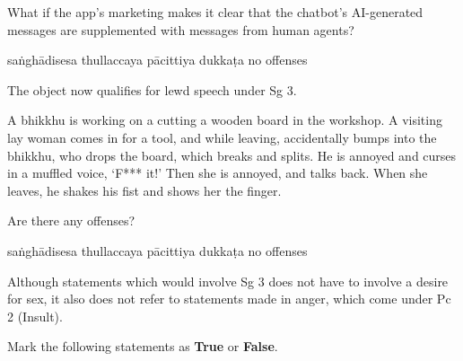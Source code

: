 \begin{exam}{\autoExamName}
\begin{problem*}
\begin{parts}
    \item What if the app's marketing makes it clear that the chatbot's AI-generated messages are supplemented with messages from human agents?

    \begin{answers}{5}
        \bChoices
         saṅghādisesa\eAns
         thullaccaya\eAns
         pācittiya\eAns
         dukkaṭa\eAns
         no offenses\eAns
        \eChoices
    \end{answers}

    \begin{solution}
      The object now qualifies for lewd speech under Sg 3.
    \end{solution}

  \end{parts}

\end{problem*}

\problemDivide

\begin{problem}
  A bhikkhu is working on a cutting a wooden board in the workshop.
  A visiting lay woman comes in for a tool, and while leaving, accidentally bumps into the bhikkhu, who drops the board, which breaks and splits.
  He is annoyed and curses in a muffled voice, `F*** it!'
  Then she is annoyed, and talks back.
  When she leaves, he shakes his fist and shows her the finger.

  Are there any offenses?

  \begin{answers}{5}
    \bChoices
     saṅghādisesa\eAns
     thullaccaya\eAns
     pācittiya\eAns
     dukkaṭa\eAns
     no offenses\eAns
    \eChoices
  \end{answers}

  \begin{solution}
    Although statements which would involve Sg 3 does not have to involve a desire for sex,
    it also does not refer to statements made in anger, which come under Pc 2 (Insult).
  \end{solution}

\end{problem}

\ifnosolutions
\clearpage
\else
\problemDivide
\fi

\begin{problem*}

  Mark the following statements as \textbf{True} or \textbf{False}.


\end{problem*}
\end{exam}
